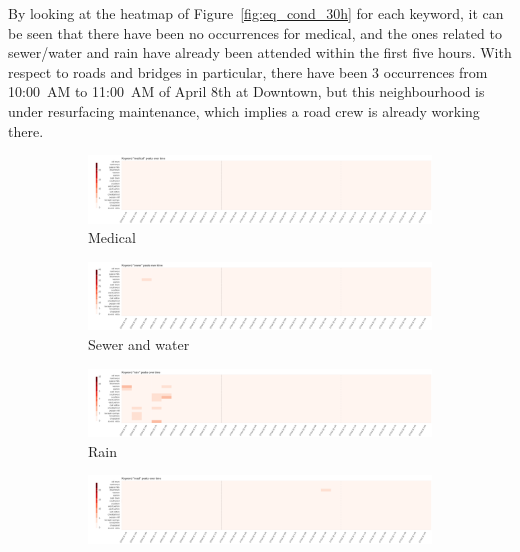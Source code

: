 By looking at the heatmap of Figure~\ref{fig:eq_cond_30h} for each keyword, it
can be seen that there have been no occurrences for medical, and the ones
related to sewer/water and rain have already been attended within the first five
hours. With respect to roads and bridges in particular, there have been 3
occurrences from 10:00~AM to 11:00~AM of April 8th at Downtown, but this
neighbourhood is under resurfacing maintenance, which implies a road crew is
already working there.

\begin{figure}[!h]
    \centering
    \begin{subfigure}[!h]{0.24\textwidth}
        \centering
        \includegraphics[width=1.00\textwidth]{figs/cond_30h/cond_30h_medical.png}
        \caption{Medical}
        \label{fig:medical_30h}
    \end{subfigure}
    \begin{subfigure}[!h]{0.24\textwidth}
        \centering
        \includegraphics[width=1.00\textwidth]{figs/cond_30h/cond_30h_sewer.png}
        \caption{Sewer and water}
        \label{fig:sewer_30h}
    \end{subfigure}
    \begin{subfigure}[!h]{0.24\textwidth}
        \centering
        \includegraphics[width=1.00\textwidth]{figs/cond_30h/cond_30h_rain.png}
        \caption{Rain}
        \label{fig:rain_30h}
    \end{subfigure}
    \begin{subfigure}[!h]{0.24\textwidth}
        \centering
        \includegraphics[width=1.00\textwidth]{figs/cond_30h/cond_30h_road.png}

\end{subfigure}
\end{figure}
